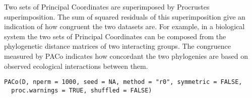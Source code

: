 \documentclass[letterpaper]{book}
\begin{document}
%
\begin{Description}\relax
Two sets of Principal Coordinates are superimposed by Procrustes superimposition. The sum of squared residuals of this superimposition give an indication of how congruent the two datasets are. For example, in a biological system the two sets of Principal Coordinates can be composed from the phylogenetic distance matrices of two interacting groups. The congruence measured by PACo indicates how concordant the two phylogenies are based on observed ecological interactions between them.
\end{Description}
%
\begin{Usage}
\begin{verbatim}
PACo(D, nperm = 1000, seed = NA, method = "r0", symmetric = FALSE,
  proc.warnings = TRUE, shuffled = FALSE)
\end{verbatim}
\end{Usage}
%
\end{document}
